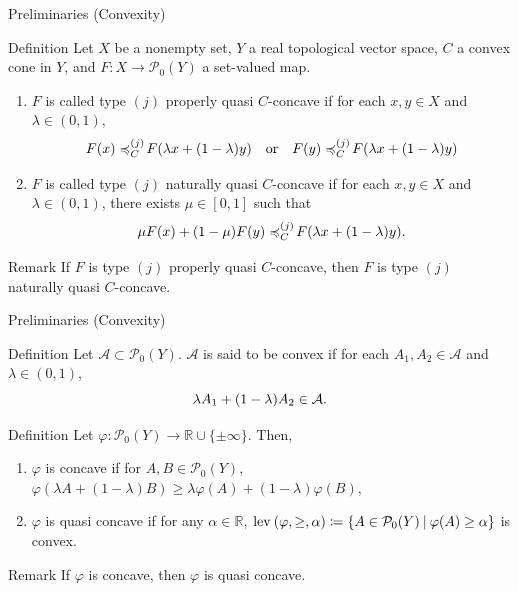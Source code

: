 \documentclass[aspectratio=169, dvipdfmx, 11pt]{beamer}
\newcommand{\RealNumberSet}{\mathbb{R}}
\newcommand{\OrderingLevelSets}[3]{\text{\rm lev\:$({#1}, {#2}, {#3})$}} %
\newcommand{\pow}[1]{\mathcal{P}_{0}(#1)}
\newcommand{\SetForm}[2]{
  \{{#1}\:|\:{#2}\}
}
\newcommand{\setrel}[2]{\preccurlyeq^{(#1)}_{#2}\!}
\begin{document}
\begin{frame}{Preliminaries (Convexity)}
  \begin{block}{Definition}
    Let $X$ be a nonempty set, $Y$ a real topological vector space, $C$ a convex cone in $Y$, and $F\colon X \to \pow{Y}$ a set-valued map.
    \begin{enumerate}
      \item $F$ is called type $(j)$ properly quasi $C$-concave if for each $x,y \in X$ and $\lambda \in (0,1)$,
            \begin{equation}
              F(x) \setrel{j}{C} F(\lambda x + (1-\lambda)y) \quad \text{or} \quad F(y) \setrel{j}{C} F(\lambda x + (1-\lambda)y) \notag
            \end{equation}
      \item $F$ is called type $(j)$ naturally quasi $C$-concave if for each $x,y \in X$ and $\lambda \in (0,1)$, there exists $\mu \in [0,1]$ such that
            \begin{equation}
              \mu F(x) + (1-\mu) F(y) \setrel{j}{C} F(\lambda x + (1-\lambda)y). \notag
            \end{equation}
    \end{enumerate}
  \end{block}
  \begin{alertblock}{Remark}
    If $F$ is type $(j)$ properly quasi $C$-concave,
    then $F$ is type $(j)$ naturally quasi $C$-concave.
  \end{alertblock}
\end{frame}

\begin{frame}{Preliminaries (Convexity)}
  \begin{block}{Definition \cite{MR3458699}}
    Let $\mathcal{A} \subset \pow{Y}$. $\mathcal{A}$ is said to be convex if for each $A_1, A_2 \in \mathcal{A}$ and $\lambda \in (0,1)$,
    \begin{equation}
      \lambda A_1 + (1-\lambda) A_2 \in \mathcal{A}. \notag
    \end{equation}
  \end{block}

  \begin{block}{Definition \cite{MR3458699}}
    Let $\varphi \colon \pow{Y} \to \RealNumberSet \cup \{\pm \infty\}$. Then,
    \begin{enumerate}
      \item $\varphi$ is concave if for $A, B \in \pow{Y}$,
            $\varphi(\lambda A + (1-\lambda) B) \geq  \lambda \varphi (A) + (1- \lambda) \varphi (B)$,
      \item $\varphi$ is quasi concave if for any $\alpha \in \RealNumberSet$,
            $\OrderingLevelSets{\varphi}{\geq}{\alpha} \coloneqq \SetForm{A \in \pow{Y}}{\varphi(A) \geq \alpha}$ is convex.
    \end{enumerate}
  \end{block}

  \begin{alertblock}{Remark}
    If $\varphi$ is concave, then $\varphi$ is quasi concave.
  \end{alertblock}
\end{frame}
\end{document}

